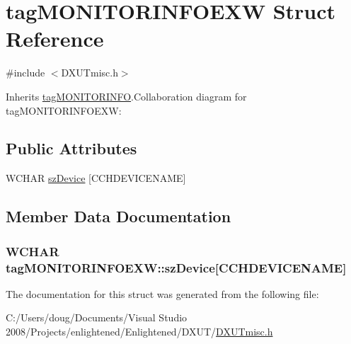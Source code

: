 \hypertarget{structtag_m_o_n_i_t_o_r_i_n_f_o_e_x_w}{
\section{tagMONITORINFOEXW Struct Reference}
\label{structtag_m_o_n_i_t_o_r_i_n_f_o_e_x_w}
}


{\ttfamily \#include $<$DXUTmisc.h$>$}

Inherits \hyperlink{structtag_m_o_n_i_t_o_r_i_n_f_o}{tagMONITORINFO}.Collaboration diagram for tagMONITORINFOEXW:\subsection*{Public Attributes}
\begin{DoxyCompactItemize}
\item 
WCHAR \hyperlink{structtag_m_o_n_i_t_o_r_i_n_f_o_e_x_w_a9d7d6cb2b406ae4f747f9a21cb34e6ab}{szDevice} \mbox{[}CCHDEVICENAME\mbox{]}
\end{DoxyCompactItemize}


\subsection{Member Data Documentation}
\hypertarget{structtag_m_o_n_i_t_o_r_i_n_f_o_e_x_w_a9d7d6cb2b406ae4f747f9a21cb34e6ab}{
\subsubsection[{szDevice}]{\setlength{\rightskip}{0pt plus 5cm}WCHAR {\bf tagMONITORINFOEXW::szDevice}\mbox{[}CCHDEVICENAME\mbox{]}}}
\label{structtag_m_o_n_i_t_o_r_i_n_f_o_e_x_w_a9d7d6cb2b406ae4f747f9a21cb34e6ab}


The documentation for this struct was generated from the following file:\begin{DoxyCompactItemize}
\item 
C:/Users/doug/Documents/Visual Studio 2008/Projects/enlightened/Enlightened/DXUT/\hyperlink{_d_x_u_tmisc_8h}{DXUTmisc.h}\end{DoxyCompactItemize}
